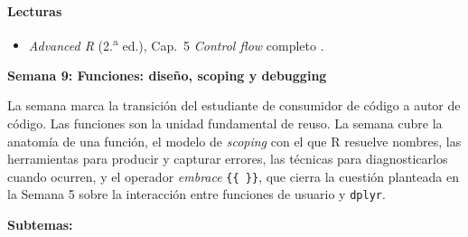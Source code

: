 \documentclass[11pt,letterpaper]{article}
\newcommand{\semana}[2]{%
  \bigskip%
  {\color{main}\Large\bfseries Semana #1: #2\par}%
  \smallskip%
}
\begin{document}
\medskip
\noindent\textbf{Lecturas}
\begin{itemize}[leftmargin=*, itemsep=1pt]
    \item \textit{Advanced R} (2.\textsuperscript{a} ed.), Cap.\ 5 \textit{Control flow} completo \cite{wickham2019advr}.
\end{itemize}

\semana{9}{Funciones: diseño, scoping y debugging}

La semana marca la transición del estudiante de consumidor de código a autor de código. Las funciones son la unidad fundamental de reuso. La semana cubre la anatomía de una función, el modelo de \textit{scoping} con el que R resuelve nombres, las herramientas para producir y capturar errores, las técnicas para diagnosticarlos cuando ocurren, y el operador \textit{embrace} \texttt{\{\{~\}\}}, que cierra la cuestión planteada en la Semana 5 sobre la interacción entre funciones de usuario y \texttt{dplyr}.

\textbf{Subtemas:}
\end{document}
